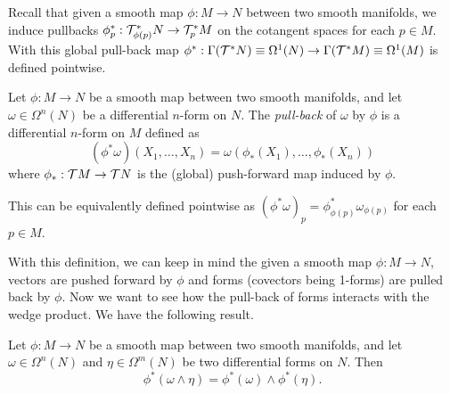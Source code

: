 Recall that given a smooth map \(\phi: M \to N\) between two smooth manifolds, we induce pullbacks \(\phi^*_p: \mathcal T^*_{\phi(p)} N \to \mathcal T^*_p M\) on the cotangent spaces for each \(p \in M\). With this global pull-back map \(\phi^*: \Gamma(\mathcal T^* N) \equiv \Omega^1(N) \to \Gamma(\mathcal T^* M) \equiv \Omega^1(M)\) is defined pointwise.

\begin{definition}
    Let \(\phi: M \to N\) be a smooth map between two smooth manifolds, and let \(\omega \in \Omega^n(N)\) be a differential \(n\)-form on \(N\). The \emph{pull-back} of \(\omega\) by \(\phi\) is a differential \(n\)-form on \(M\) defined as
    \begin{equation*}
        (\phi^* \omega)(X_1, \ldots, X_n) = \omega(\phi_*(X_1), \ldots, \phi_*(X_n))
    \end{equation*}
    where \(\phi_*: \mathcal T M \to \mathcal T N\) is the (global) push-forward map induced by \(\phi\).

    This can be equivalently defined pointwise as \((\phi^* \omega)_p = \phi^*_{\phi(p)} \omega_{\phi(p)}\) for each \(p \in M\).
\end{definition}
With this definition, we can keep in mind the given a smooth map \(\phi: M \to N\), vectors are pushed forward by \(\phi\) and forms (covectors being 1-forms) are pulled back by \(\phi\). Now we want to see how the pull-back of forms interacts with the wedge product. We have the following result.
\begin{theorem}
    Let \(\phi: M \to N\) be a smooth map between two smooth manifolds, and let \(\omega \in \Omega^n(N)\) and \(\eta \in \Omega^m(N)\) be two differential forms on \(N\). Then
    \begin{equation*}
        \phi^*(\omega \wedge \eta) = \phi^*(\omega) \wedge \phi^*(\eta).
    \end{equation*}
\end{theorem}
